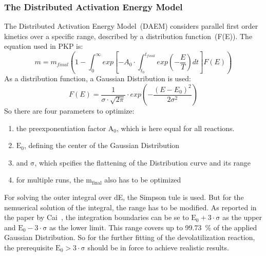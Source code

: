 \subsubsection{The Distributed Activation Energy Model}\label{SSS_DAEM}
The Distributed Activation Energy Model~(DAEM) considers parallel first order kinetics over a specific range, described by a distribution function~(F(E)). The equation used in PKP is:
\begin{equation}\label{E_DAEM}
 m = m_{final} \left( 1 - \int_{0}^{\infty} exp\left[ -A_0 \cdot \int^{t_{final}}_{t_0} exp\left( -\frac{E}{T} \right) dt  \right] F(E) \right)
\end{equation}
As a distribution function, a Gaussian Distribution is used:
\begin{equation}\label{E_GaussDistr}
 F(E) = \frac{1}{\sigma \cdot \sqrt{2\pi}} \cdot exp \left( -\frac{(E-E_0)^2}{2\sigma^2} \right)
\end{equation}
So there are four parameters to optimize:\\
\begin{enumerate}
 \item the preexponentiation factor $\mathrm{A_0}$, which is here equal for all reactions.
 \item $\mathrm{E_0}$, defining the center of the Gaussian Distribution
 \item and $\mathrm{\sigma}$, which spcifies the flattening of the Distribution curve and its range
 \item for multiple runs, the $\mathrm{m_{final}}$ also has to be optimized
\end{enumerate}
For solving the outer integral over dE, the Simpson tule is used. But for the nemuerical solution of the integral, the range has to be modified. As reported in the paper by Cai~\cite{Cai_DAEM1}, the integration boundaries can be se to $\mathrm{E_0 + 3 \cdot \sigma}$ as the upper and $\mathrm{E_0 - 3 \cdot \sigma}$ as the lower limit. This range covers up to 99.73~\% of the applied Gaussian Distribution. So for the further fitting of the devolatilization reaction, the prerequisite $\mathrm{E_0 > 3 \cdot \sigma}$ should be in force to achieve realistic results.\\
